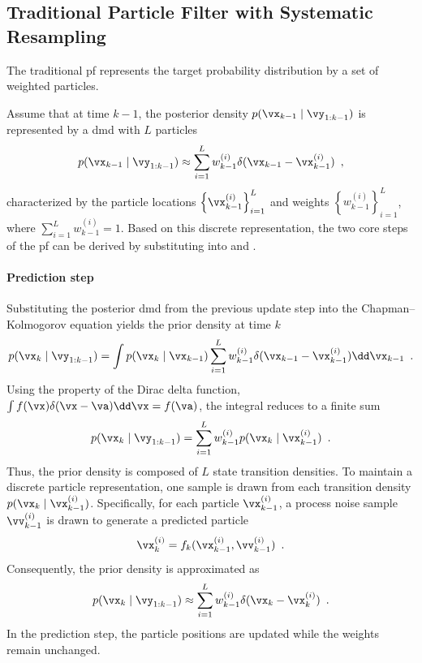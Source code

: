 \subsection{Traditional Particle Filter with Systematic Resampling}
\label{subsec:tpf_resampling}

The traditional \ac{pf} represents the target probability distribution by a set of weighted particles.

Assume that at time $k-1$, the posterior density $p(\vx_{k-1} \mid \vy_{1:k-1})$ is represented by a \ac{dmd} with $L$ particles
\begin{equation}
	p(\vx_{k-1} \mid \vy_{1:k-1}) \approx \sum_{i=1}^L w_{k-1}^{(i)} \delta(\vx_{k-1} - \vx_{k-1}^{(i)})\enspace,
	\label{eq:dmd_posterior}
\end{equation}
characterized by the particle locations $\left\{ \vx_{k-1}^{(i)} \right\}_{i=1}^L$ and weights $\left\{ w_{k-1}^{(i)} \right\}_{i=1}^L$, where $\sum_{i=1}^L w_{k-1}^{(i)} = 1$. Based on this discrete representation, the two core steps of the \ac{pf} can be derived by substituting  into  and .

\paragraph{Prediction step}

Substituting the posterior \ac{dmd} from the previous update step into the Chapman--Kolmogorov equation  yields the prior density at time $k$
\begin{equation}
	p(\vx_k \mid \vy_{1:k-1}) = \int p(\vx_k \mid \vx_{k-1}) \sum_{i=1}^L w_{k-1}^{(i)} \delta(\vx_{k-1} - \vx_{k-1}^{(i)}) \dd\vx_{k-1} \enspace.
\end{equation}
Using the property of the Dirac delta function, $\int f(\vx)\delta(\vx-\va)\dd \vx = f(\va)$, the integral reduces to a finite sum
\begin{equation}
	p(\vx_k \mid \vy_{1:k-1}) = \sum_{i=1}^L w_{k-1}^{(i)} p(\vx_k \mid \vx_{k-1}^{(i)}) \enspace.
\end{equation}
Thus, the prior density is composed of $L$ state transition densities. To maintain a discrete particle representation, one sample is drawn from each transition density $p(\vx_k \mid \vx_{k-1}^{(i)})$. Specifically, for each particle $\vx_{k-1}^{(i)}$, a process noise sample $\vv_{k-1}^{(i)}$ is drawn to generate a predicted particle
\[
\vx_k^{(i)} = f_k(\vx_{k-1}^{(i)}, \vv_{k-1}^{(i)})\enspace.
\]
Consequently, the prior density is approximated as
\begin{equation}
	p(\vx_k \mid \vy_{1:k-1}) \approx \sum_{i=1}^L w_{k-1}^{(i)} \delta(\vx_k - \vx_k^{(i)})\enspace.
	\label{eq:pf_prior_discrete}
\end{equation}
In the prediction step, the particle positions are updated while the weights remain unchanged.

